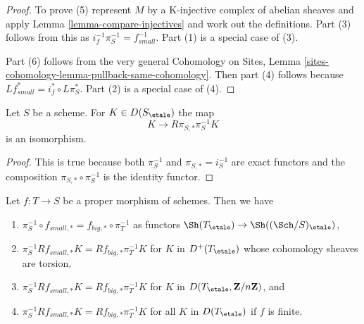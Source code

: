 \begin{proof}
To prove (5) represent $M$ by a K-injective complex of abelian sheaves
and apply Lemma \ref{lemma-compare-injectives}
and work out the definitions. Part (3) follows from
this as $i_f^{-1}\pi_S^{-1} = f_{small}^{-1}$. Part (1) is a special
case of (3).

\medskip\noindent
Part (6) follows from the very general Cohomology on Sites, Lemma
\ref{sites-cohomology-lemma-pullback-same-cohomology}. Then part
(4) follows because $Lf_{small}^* = i_f^* \circ L\pi_S^*$.
Part (2) is a special case of (4).
\end{proof}

\begin{lemma}
\label{lemma-cohomological-descent-etale}
Let $S$ be a scheme. For $K \in D(S_\etale)$ the map
$$
K \longrightarrow R\pi_{S, *}\pi_S^{-1}K
$$
is an isomorphism.
\end{lemma}

\begin{proof}
This is true because both $\pi_S^{-1}$ and $\pi_{S, *} = i_S^{-1}$
are exact functors and the composition $\pi_{S, *} \circ \pi_S^{-1}$
is the identity functor.
\end{proof}

\begin{lemma}
\label{lemma-compare-higher-direct-image-proper}
Let $f : T \to S$ be a proper morphism of schemes. Then we have
\begin{enumerate}
\item $\pi_S^{-1} \circ f_{small, *} = f_{big, *} \circ \pi_T^{-1}$
as functors $\Sh(T_\etale) \to \Sh((\Sch/S)_\etale)$,
\item $\pi_S^{-1}Rf_{small, *}K = Rf_{big, *}\pi_T^{-1}K$
for $K$ in $D^+(T_\etale)$ whose cohomology sheaves are torsion,
\item $\pi_S^{-1}Rf_{small, *}K = Rf_{big, *}\pi_T^{-1}K$
for $K$ in $D(T_\etale, \mathbf{Z}/n\mathbf{Z})$, and
\item $\pi_S^{-1}Rf_{small, *}K = Rf_{big, *}\pi_T^{-1}K$
for all $K$ in $D(T_\etale)$ if $f$ is finite.
\end{enumerate}
\end{lemma}

